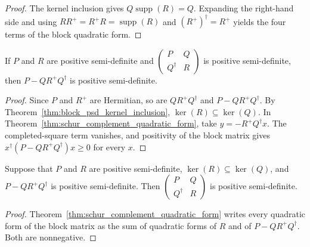 \begin{proof}\leanok
  The kernel inclusion gives
  $Q\operatorname{supp}(R)=Q$. Expanding the right-hand side and using
  $RR^+=R^+R=\operatorname{supp}(R)$ and $(R^+)^\dagger=R^+$ yields the
  four terms of the block quadratic form.
\end{proof}

\begin{theorem}
  \label{thm:schur_complement_psd_of_block_psd}
  \leanok
  If $P$ and $R$ are positive semi-definite and
  $\begin{pmatrix}P&Q\\Q^\dagger&R\end{pmatrix}$ is positive
  semi-definite, then $P-QR^+Q^\dagger$ is positive semi-definite.
\end{theorem}

\begin{proof}\leanok
  Since $P$ and $R^+$ are Hermitian, so are $QR^+Q^\dagger$ and
  $P-QR^+Q^\dagger$.
  By Theorem~\ref{thm:block_psd_kernel_inclusion},
  $\ker(R)\subseteq\ker(Q)$. In
  Theorem~\ref{thm:schur_complement_quadratic_form}, take
  $y=-R^+Q^\dagger x$. The completed-square term vanishes, and positivity of
  the block matrix gives
  $x^\dagger(P-QR^+Q^\dagger)x\ge 0$ for every $x$.
\end{proof}

\begin{theorem}
  \label{thm:block_psd_of_schur_complement_psd}
  \leanok
  Suppose that $P$ and $R$ are positive semi-definite,
  $\ker(R)\subseteq\ker(Q)$, and $P-QR^+Q^\dagger$ is positive
  semi-definite. Then
  $\begin{pmatrix}P&Q\\Q^\dagger&R\end{pmatrix}$ is positive
  semi-definite.
\end{theorem}

\begin{proof}\leanok
  Theorem~\ref{thm:schur_complement_quadratic_form} writes every quadratic
  form of the block matrix as the sum of quadratic forms of $R$ and of
  $P-QR^+Q^\dagger$. Both are nonnegative.
\end{proof}

